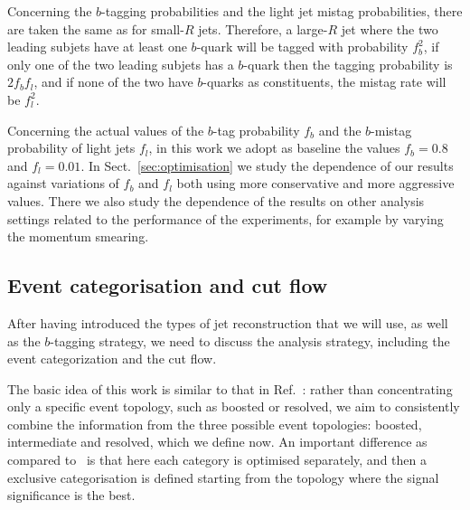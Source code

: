 \begin{itemize}
    Concerning the $b$-tagging probabilities and the
    light jet mistag probabilities, there are taken
    the same as for small-$R$ jets.
    Therefore, a large-$R$ jet where the two leading
    subjets have at least one $b$-quark will be tagged
    with probability $f_b^2$, if only one of the two leading
    subjets has a $b$-quark then the tagging probability is
    $2f_bf_l$, and if none of the two have $b$-quarks
    as constituents, the mistag rate will be
    $f_l^2$.


\end{itemize}

Concerning the actual values of the $b$-tag probability $f_b$ and
the $b$-mistag probability of light jets $f_l$, in this work
we adopt as baseline the values $f_b=0.8$ and $f_l=0.01$.
%
In Sect.~\ref{sec:optimisation} we study the dependence of
our results against variations of $f_b$ and $f_l$ both
using more conservative and more aggressive values.
%
There we also study the dependence of the results
on other analysis settings related to the performance of
the experiments, for example by varying the momentum smearing.

\subsection{Event categorisation and cut flow}
\label{sec:categorisation}

After having introduced the types of jet reconstruction
that we will use, as well as the $b$-tagging strategy,
we need to discuss the analysis strategy, including
the event categorization and the cut flow.

The basic idea of this work is similar to that in Ref.~\cite{Gouzevitch:2013qca}:
rather than concentrating only a specific event topology, such as boosted
or resolved, we aim to consistently combine the information from
the three possible event topologies: boosted, intermediate and
resolved, which we define now.
%
An important difference as compared to~\cite{Gouzevitch:2013qca}
is that here each category is optimised separately, and then
a exclusive categorisation is defined starting from the topology
where the signal significance is the best.

